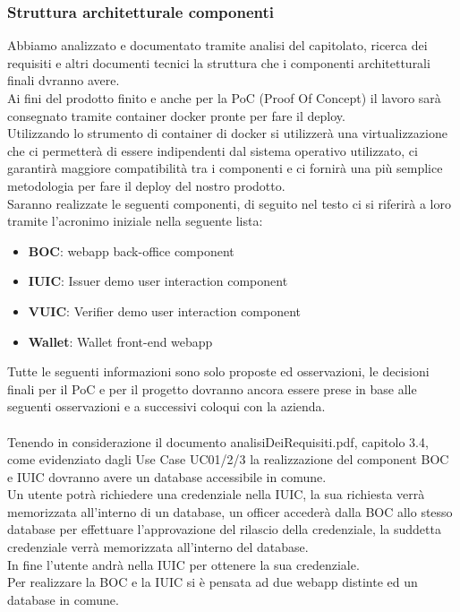 \subsubsection{Struttura architetturale componenti}
Abbiamo analizzato e documentato tramite analisi del capitolato, ricerca dei requisiti e altri documenti tecnici la struttura che i componenti architetturali finali dvranno avere.\\
Ai fini del prodotto finito e anche per la PoC (Proof Of Concept) il lavoro sarà consegnato tramite container docker pronte per fare il deploy.\\
Utilizzando lo strumento di container di docker si utilizzerà una virtualizzazione che ci permetterà di essere indipendenti dal sistema operativo utilizzato, ci garantirà maggiore compatibilità tra i componenti e ci fornirà una più semplice metodologia per fare il deploy del nostro prodotto.\\
Saranno realizzate le seguenti componenti, di seguito nel testo ci si riferirà a loro tramite l'acronimo iniziale nella seguente lista:
\begin{itemize}
	\item \textbf{BOC}: webapp back-office component
	\item \textbf{IUIC}: Issuer demo user interaction component 
	\item \textbf{VUIC}: Verifier demo user interaction component 
	\item \textbf{Wallet}: Wallet front-end webapp
\end{itemize}
Tutte le seguenti informazioni sono solo proposte ed osservazioni, le decisioni finali per il PoC e per il progetto dovranno ancora essere prese in base alle seguenti osservazioni e a successivi coloqui con la azienda.\\
\\
Tenendo in considerazione il documento analisiDeiRequisiti.pdf, capitolo 3.4, come evidenziato dagli Use Case UC01/2/3 la realizzazione
del component BOC e IUIC dovranno avere un database accessibile in comune.\\
Un utente potrà richiedere una credenziale nella IUIC, la sua richiesta verrà memorizzata all'interno di un database, un officer accederà
dalla BOC allo stesso database per effettuare l'approvazione del rilascio della credenziale, la suddetta credenziale verrà memorizzata all'interno del database.\\
In fine l'utente andrà nella IUIC per ottenere la sua credenziale.\\
Per realizzare la BOC e la IUIC si è pensata ad due webapp distinte ed un database in comune.\\
